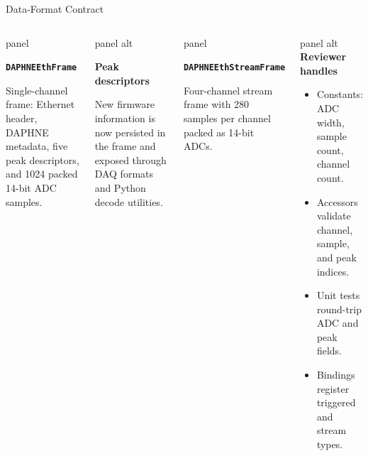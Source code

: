\documentclass[aspectratio=169,10pt]{beamer}
\begin{document}
\begin{frame}[t]{Data-Format Contract}
\begin{columns}[T,onlytextwidth]
\begin{beamercolorbox}[wd=\linewidth,sep=4pt,rounded=true]{panel}
\scriptsize
{\color{noircyan}\bfseries\texttt{DAPHNEEthFrame}\par}
Single-channel frame: Ethernet header, DAPHNE metadata, five peak descriptors, and 1024 packed 14-bit ADC samples.
\end{beamercolorbox}

\vspace{1mm}
\begin{beamercolorbox}[wd=\linewidth,sep=4pt,rounded=true]{panel alt}
\scriptsize
{\color{noircyan}\bfseries Peak descriptors\par}
New firmware information is now persisted in the frame and exposed through DAQ formats and Python decode utilities.
\end{beamercolorbox}

\vspace{1mm}
\begin{beamercolorbox}[wd=\linewidth,sep=4pt,rounded=true]{panel}
\scriptsize
{\color{noircyan}\bfseries\texttt{DAPHNEEthStreamFrame}\par}
Four-channel stream frame with 280 samples per channel packed as 14-bit ADCs.
\end{beamercolorbox}

\begin{beamercolorbox}[wd=\linewidth,sep=4pt,rounded=true]{panel alt}
\scriptsize
\textcolor{noircyan}{\textbf{Reviewer handles}}
\vspace{0.5mm}
\begin{itemize}
  \item Constants: ADC width, sample count, channel count.
  \item Accessors validate channel, sample, and peak indices.
  \item Unit tests round-trip ADC and peak fields.
  \item Bindings register triggered and stream types.
\end{itemize}
\end{beamercolorbox}
\end{columns}
\end{frame}
\end{document}
